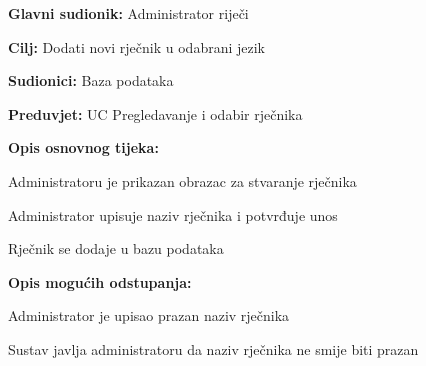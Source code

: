 \noindent {}
\begin{packed_item}

	\item \textbf{Glavni sudionik: } Administrator riječi
	\item \textbf{Cilj: } Dodati novi rječnik u odabrani jezik
	\item \textbf{Sudionici: } Baza podataka
	\item \textbf{Preduvjet: } UC Pregledavanje i odabir rječnika
	\item  \textbf{Opis osnovnog tijeka:}
	
	\item[] \begin{packed_enum}
		
		\item Administratoru je prikazan obrazac za stvaranje rječnika
		\item Administrator upisuje naziv rječnika i potvrđuje unos
		\item Rječnik se dodaje u bazu podataka

	\end{packed_enum}

	\item  \textbf{Opis mogućih odstupanja:}
	
	\item[] \begin{packed_item}

		\item[2.a] Administrator je upisao prazan naziv rječnika
		\item[] \begin{packed_enum}
			
			\item Sustav javlja administratoru da naziv rječnika ne smije biti prazan
			
		\end{packed_enum}
		
	\end{packed_item}

\end{packed_item}

